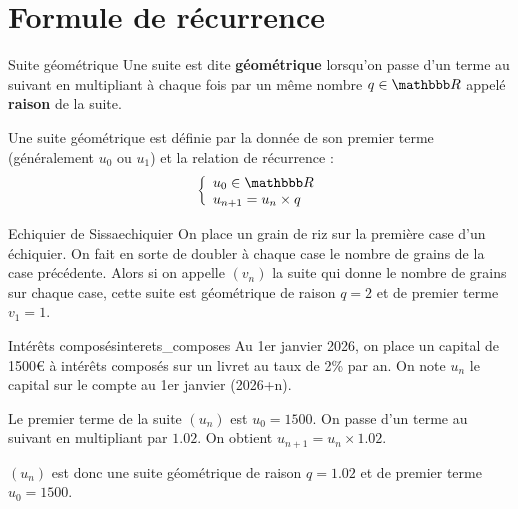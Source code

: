 \documentclass[10pt,a4paper,openany,twoside]{book}
\begin{document}
	\entetegal


\section{Formule de récurrence}

\begin{defi}{Suite géométrique}{}
	Une suite est dite \textbf{géométrique} lorsqu'on passe d'un terme au suivant en multipliant à chaque fois par un même nombre $q\in\R$ appelé \textbf{raison} de la suite.

	\noindent Une suite géométrique est définie par la donnée de son premier terme (généralement $u_0$ ou $u_1$) et la relation de récurrence :
	\[ \left\lbrace
	\begin{array}{l}
		u_0\in \R\\
		u_{n+1} = u_n \times q\\
	\end{array}
	\right. \]
	\begin{center}
	\end{center}
\end{defi}

\begin{ex}{Echiquier de Sissa}{echiquier}
 On place un grain de riz sur la première case d'un échiquier. On fait en sorte de doubler à chaque case le nombre de grains de la case précédente. Alors si on appelle $(v_n)$ la suite qui donne le nombre de grains sur chaque case, cette suite est géométrique de raison $q=2$ et de premier terme $v_1=1$.
\end{ex}

\begin{ex}{Intérêts composés}{interets_composes}
	Au 1er janvier 2026, on place un capital de 1500€ à intérêts composés sur un livret au taux de 2\% par an. On note $u_n$ le capital sur le compte au 1er janvier (2026+n).

	Le premier terme de la suite $(u_n)$ est $u_0 = 1500$.
On passe d'un terme au suivant en multipliant par $1.02$. On obtient $u_{n+1} = u_n \times 1.02$.

$(u_n)$ est donc une suite géométrique de raison $q=1.02$ et de premier terme $u_0=1500$.
\end{ex}
\end{document}
